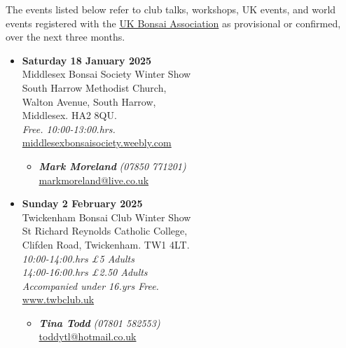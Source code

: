 
\label{2025-01-events}
\noindent
The events listed below refer to club talks, workshops, UK events, and world events registered with the \href{https://www.ukbonsaiassoc.org/events.html}{UK Bonsai Association} as provisional or confirmed, over the next three months.
\begin{itemize}
    \item \textbf{Saturday 18 January 2025}
    \\
    Middlesex Bonsai Society Winter Show \\
    South Harrow Methodist Church, \\
    Walton Avenue, South Harrow, \\
    Middlesex. HA2 8QU.
    \\
    \emph{Free. 10:00-13:00.hrs.}
    \\
    \href{https://middlesexbonsaisociety.weebly.com/}{middlesexbonsaisociety.weebly.com}
    \begin{itemize}
        \item \textbf{\emph{Mark Moreland}} \emph{(07850 771201)} \\
        \href{mailto:markmoreland@live.co.uk}{markmoreland@live.co.uk} 
    \end{itemize}

    \item \textbf{Sunday 2 February 2025}
    \\
    Twickenham Bonsai Club Winter Show \\
    St Richard Reynolds Catholic College, \\
    Clifden Road, Twickenham. TW1 4LT.
    \\
    \emph{10:00-14:00.hrs £5 Adults} \\
    \emph{14:00-16:00.hrs £2.50 Adults} \\
    \emph{Accompanied under 16.yrs Free.}
    \\
    \href{https://www.twbclub.uk}{www.twbclub.uk}
    \begin{itemize}
        \item \textbf{\emph{Tina Todd}} \emph{(07801 582553)} \\
        \href{mailto:toddytl@hotmail.co.uk}{toddytl@hotmail.co.uk} 
    \end{itemize}


\end{itemize}
